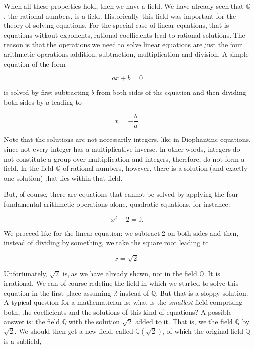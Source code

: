\documentclass[tikz]{scrreprt}
\begin{document}
When all these properties hold, then we have a field.
We have already seen that $\mathbb{Q}$, the rational numbers,
is a field. Historically, this field was important for
the theory of solving equations. For the special case of
linear equations, that is equations without exponents,
rational coefficients lead to rational solutions. The reason is
that the operations we need to solve linear equations are
just the four arithmetic operations addition, subtraction,
multiplication and division. A simple equation of the form

\begin{equation}
ax + b = 0
\end{equation}

is solved by first subtracting $b$ from both sides of the equation
and then dividing both sides by $a$ leading to

\begin{equation}
x = -\frac{b}{a}.
\end{equation}

Note that the solutions are not necessarily integers,
like in Diophantine equations, since not every integer
has a multiplicative inverse. In other words, integers
do not constitute a group over multiplication and integers,
therefore, do not form a field.
In the field $\mathbb{Q}$ of rational numbers, however,
there is a solution (and exactly one solution) that lies
within that field.

But, of course, there are equations that cannot be solved
by applying the four fundamental arithmetic operations alone,
quadratic equations, for instance:

\begin{equation}
x^2 - 2 = 0.
\end{equation}

We proceed like for the linear equation: we subtract
2 on both sides and then, instead of dividing by something,
we take the square root leading to

\begin{equation}
x = \sqrt{2}.
\end{equation}

Unfortunately, $\sqrt{2}$ is, as we have already shown,
not in the field $\mathbb{Q}$. It is irrational.
We can of course redefine the field 
in which we started to solve this equation in the first place
assuming $\mathbb{R}$ instead of $\mathbb{Q}$.
But that is a sloppy solution.
A typical question for a mathematician is:
what is the \emph{smallest} field comprising both,
the coefficients and the solutions of this kind of equations?
A possible answer is: the field $\mathbb{Q}$ with the solution
$\sqrt{2}$ added to it. 
That is, we  the field $\mathbb{Q}$
by  $\sqrt{2}$.
We should then get a new field, called $\mathbb{Q}(\sqrt{2})$,
of which the original field $\mathbb{Q}$ is a subfield,
\ie\
\end{document}
